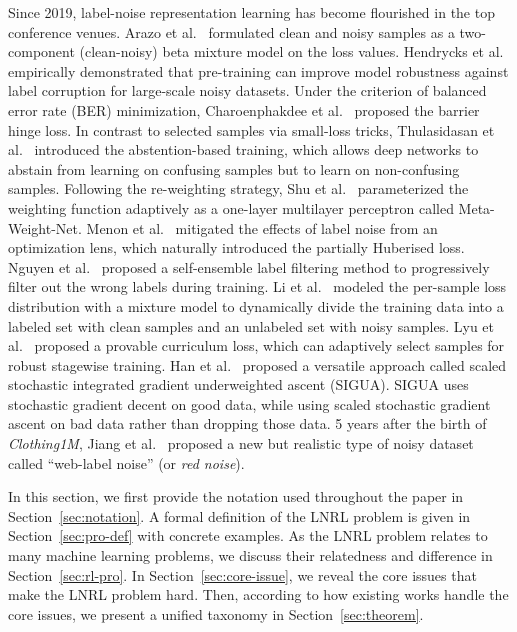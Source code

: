 \label{sec:intro:mat}
Since 2019, label-noise representation learning has become flourished in the top conference venues. Arazo et al.~ formulated clean and noisy samples as a two-component (clean-noisy) beta mixture model on the loss values. Hendrycks et al.~ empirically demonstrated that pre-training can improve model robustness against label corruption for large-scale noisy datasets. Under the criterion of balanced error rate (BER) minimization, Charoenphakdee et al.~ proposed the barrier hinge loss. In contrast to selected samples via small-loss tricks, Thulasidasan et al.~ introduced the abstention-based training, which allows deep networks to abstain from learning on confusing samples but to learn on non-confusing samples. Following the re-weighting strategy, Shu et al.~ parameterized the weighting function adaptively as a one-layer multilayer perceptron called Meta-Weight-Net.
Menon et al.~ mitigated the effects of
label noise from an optimization lens, which naturally introduced the partially Huberised loss. Nguyen et al.~ proposed a self-ensemble label filtering method to progressively filter out the wrong labels during training. Li et al.~ modeled the per-sample loss distribution with a mixture model to dynamically divide the training data into a labeled set with clean samples and an unlabeled set with noisy samples. Lyu et al.~ proposed a provable curriculum loss, which can adaptively select samples for robust stagewise training. Han et al.~ proposed a versatile approach called scaled stochastic integrated gradient underweighted ascent (SIGUA). SIGUA uses stochastic gradient decent on good data, while using scaled stochastic gradient ascent on bad data rather than dropping those data. 5 years after the birth of \textit{Clothing1M}, Jiang et al.~ proposed a new but realistic type of noisy dataset called ``web-label noise'' (or \textit{red noise}).

\label{sec:overview}
In this section, we first provide the notation used throughout the paper in Section~\ref{sec:notation}. 
A formal definition of the LNRL problem is given in Section~\ref{sec:pro-def} with concrete examples. As the LNRL problem relates to many machine learning problems, we discuss their relatedness and difference in Section~\ref{sec:rl-pro}. In Section~\ref{sec:core-issue}, we reveal the core issues that make the LNRL problem hard. Then, according to how existing works handle the core issues, we present a unified taxonomy in Section~\ref{sec:theorem}.

